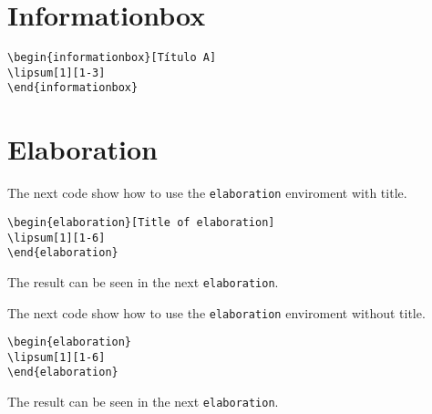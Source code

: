 
\section{Informationbox}

\lipsum[1][1-3]
\begin{highlightbox}
\begin{verbatim}
\begin{informationbox}[Título A]
\lipsum[1][1-3]
\end{informationbox}
\end{verbatim}
\end{highlightbox}
\begin{informationbox}[Título A]
\lipsum[1][1-3]
\end{informationbox}


\section{Elaboration}

The next code show how to use the \texttt{elaboration} enviroment with title.
\begin{highlightbox}
\begin{verbatim}
\begin{elaboration}[Title of elaboration]
\lipsum[1][1-6]
\end{elaboration}
\end{verbatim}
\end{highlightbox}
The result can be seen in the next \texttt{elaboration}.
\begin{elaboration}
\lipsum[1][1-6]
\end{elaboration}

The next code show how to use the \texttt{elaboration} enviroment without title.
\begin{highlightbox}
\begin{verbatim}
\begin{elaboration}
\lipsum[1][1-6]
\end{elaboration}
\end{verbatim}
\end{highlightbox}
The result can be seen in the next \texttt{elaboration}.
\begin{elaboration}
\lipsum[1][1-6]
\end{elaboration}


